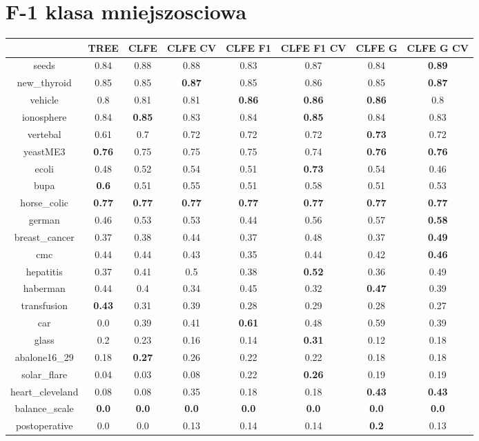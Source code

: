 \documentclass{article}%
\begin{document}
%
\section*{F{-}1 klasa mniejszosciowa}%
\begin{tabular}{c|ccccccc}%
\hline%
&TREE&CLFE&CLFE CV&CLFE F1&CLFE F1 CV&CLFE G&CLFE G CV\\%
\hline%
seeds&0.84&0.88&0.88&0.83&0.87&0.84&\textbf{0.89}\\%
new\_thyroid&0.85&0.85&\textbf{0.87}&0.85&0.86&0.85&\textbf{0.87}\\%
vehicle&0.8&0.81&0.81&\textbf{0.86}&\textbf{0.86}&\textbf{0.86}&0.8\\%
ionosphere&0.84&\textbf{0.85}&0.83&0.84&\textbf{0.85}&0.84&0.83\\%
vertebal&0.61&0.7&0.72&0.72&0.72&\textbf{0.73}&0.72\\%
yeastME3&\textbf{0.76}&0.75&0.75&0.75&0.74&\textbf{0.76}&\textbf{0.76}\\%
ecoli&0.48&0.52&0.54&0.51&\textbf{0.73}&0.54&0.46\\%
bupa&\textbf{0.6}&0.51&0.55&0.51&0.58&0.51&0.53\\%
horse\_colic&\textbf{0.77}&\textbf{0.77}&\textbf{0.77}&\textbf{0.77}&\textbf{0.77}&\textbf{0.77}&\textbf{0.77}\\%
german&0.46&0.53&0.53&0.44&0.56&0.57&\textbf{0.58}\\%
breast\_cancer&0.37&0.38&0.44&0.37&0.48&0.37&\textbf{0.49}\\%
cmc&0.44&0.44&0.43&0.35&0.44&0.42&\textbf{0.46}\\%
hepatitis&0.37&0.41&0.5&0.38&\textbf{0.52}&0.36&0.49\\%
haberman&0.44&0.4&0.34&0.45&0.32&\textbf{0.47}&0.39\\%
transfusion&\textbf{0.43}&0.31&0.39&0.28&0.29&0.28&0.27\\%
car&0.0&0.39&0.41&\textbf{0.61}&0.48&0.59&0.39\\%
glass&0.2&0.23&0.16&0.14&\textbf{0.31}&0.12&0.18\\%
abalone16\_29&0.18&\textbf{0.27}&0.26&0.22&0.22&0.18&0.18\\%
solar\_flare&0.04&0.03&0.08&0.22&\textbf{0.26}&0.19&0.19\\%
heart\_cleveland&0.08&0.08&0.35&0.18&0.18&\textbf{0.43}&\textbf{0.43}\\%
balance\_scale&\textbf{0.0}&\textbf{0.0}&\textbf{0.0}&\textbf{0.0}&\textbf{0.0}&\textbf{0.0}&\textbf{0.0}\\%
postoperative&0.0&0.0&0.13&0.14&0.14&\textbf{0.2}&0.13\\%
\end{tabular}
\end{document}
